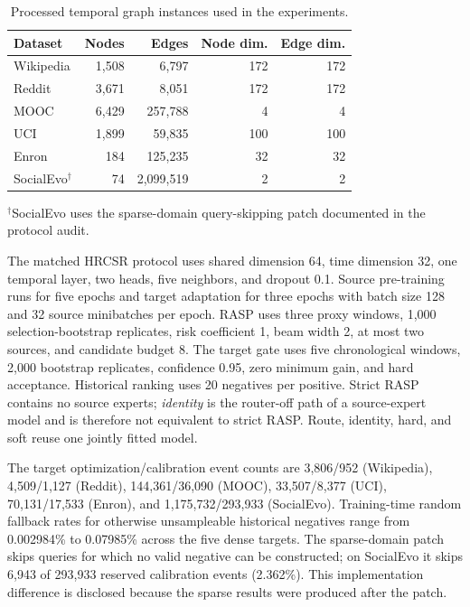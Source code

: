 \documentclass[journal]{IEEEtran}
\begin{document}
\begin{table}[t]
\centering
\caption{Processed temporal graph instances used in the experiments.}
\label{tab:datasets_revised}
\small
\begin{tabular*}{\linewidth}{@{\extracolsep{\fill}}lrrrr}
\toprule
\textbf{Dataset} & \textbf{Nodes} & \textbf{Edges} & \textbf{Node dim.} & \textbf{Edge dim.} \\
\midrule
Wikipedia & 1,508 & 6,797   & 172 & 172 \\
Reddit    & 3,671 & 8,051   & 172 & 172 \\
MOOC      & 6,429 & 257,788 & 4   & 4   \\
UCI       & 1,899 & 59,835  & 100 & 100 \\
Enron     & 184   & 125,235 & 32  & 32  \\
SocialEvo$^{\dagger}$ & 74 & 2,099,519 & 2 & 2 \\
\bottomrule
\end{tabular*}
\end{table}
{\footnotesize $^{\dagger}$SocialEvo uses the sparse-domain query-skipping patch documented in the protocol audit.}

The matched HRCSR protocol uses shared dimension 64, time dimension 32, one temporal layer, two heads, five neighbors, and dropout 0.1. Source pre-training runs for five epochs and target adaptation for three epochs with batch size 128 and 32 source minibatches per epoch. RASP uses three proxy windows, 1,000 selection-bootstrap replicates, risk coefficient 1, beam width 2, at most two sources, and candidate budget 8. The target gate uses five chronological windows, 2,000 bootstrap replicates, confidence 0.95, zero minimum gain, and hard acceptance. Historical ranking uses 20 negatives per positive. Strict RASP contains no source experts; \emph{identity} is the router-off path of a source-expert model and is therefore not equivalent to strict RASP. Route, identity, hard, and soft reuse one jointly fitted model.

The target optimization/calibration event counts are 3,806/952 (Wikipedia), 4,509/1,127 (Reddit), 144,361/36,090 (MOOC), 33,507/8,377 (UCI), 70,131/17,533 (Enron), and 1,175,732/293,933 (SocialEvo). Training-time random fallback rates for otherwise unsampleable historical negatives range from 0.002984\% to 0.07985\% across the five dense targets. The sparse-domain patch skips queries for which no valid negative can be constructed; on SocialEvo it skips 6,943 of 293,933 reserved calibration events (2.362\%). This implementation difference is disclosed because the sparse results were produced after the patch.
\end{document}
